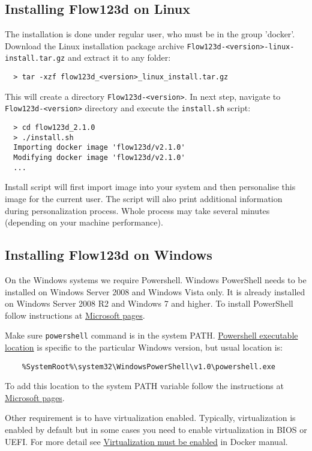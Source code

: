 \documentclass[12pt,a4paper]{report}
\begin{document}
\subsection{Installing Flow123d on Linux}
The installation is done under regular user, who must be in the group 'docker'.
Download the Linux installation package archive \verb'Flow123d-<version>-linux-install.tar.gz' and extract it to any folder:
\begin{verbatim}
  > tar -xzf flow123d_<version>_linux_install.tar.gz 
\end{verbatim}
This will create a directory \verb'Flow123d-<version>'. In next step, navigate to \verb'Flow123d-<version>' directory
and execute the \verb'install.sh' script:
\begin{verbatim}
  > cd flow123d_2.1.0
  > ./install.sh
  Importing docker image 'flow123d/v2.1.0'
  Modifying docker image 'flow123d/v2.1.0'
  ...
\end{verbatim}
Install script will first import image into your system and then personalise this image for the current user. The script will also print
additional information during personalization process. Whole process may take several minutes (depending on your machine performance).


\subsection{Installing Flow123d on Windows}
On the Windows systems we require Powershell. Windows PowerShell needs to be installed on Windows Server 2008 and Windows Vista only.
It is already installed on Windows Server 2008 R2 and Windows 7 and higher. To install PowerShell follow instructions at
\href{https://msdn.microsoft.com/en-us/powershell/scripting/setup/installing-windows-powershell}{Microsoft pages}.

Make sure \verb'powershell' command is in the system PATH. 
\href{http://www.powershelladmin.com/wiki/PowerShell_Executables_File_System_Locations}{Powershell executable location}
 is specific to the particular Windows version, but usual location is:
 \begin{verbatim}
    %SystemRoot%\system32\WindowsPowerShell\v1.0\powershell.exe  
 \end{verbatim}
 To add this location to the system PATH variable follow the instructions at
 \href{https://msdn.microsoft.com/en-us/library/office/ee537574(v=office.14).aspx}{Microsoft pages}.

Other requirement is to have virtualization enabled. Typically, virtualization is enabled by default but in some
cases you need to enable virtualization in BIOS or UEFI. For more detail see 
\href{https://docs.docker.com/docker-for-windows/troubleshoot/#virtualization-must-be-enabled}{Virtualization must be enabled} in Docker manual.
\end{document}
